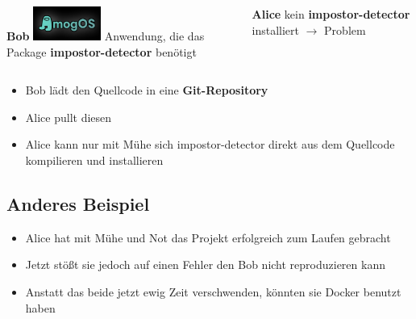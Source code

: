\begin{frame}
    \slidehead
    \vspace{-1em}
    \Large
    \begin{columns}[c]
        \begin{column}{.5\textwidth}
            \centering
            \textbf{Bob} \newline
            \includegraphics[height = 3em]{../pictures/amogos} \newline
            Anwendung, die das Package \textbf{impostor-detector} benötigt
        \end{column}
        \begin{column}{.5\textwidth}
            \centering
            \textbf{Alice} \newline
             \newline
            kein \textbf{impostor-detector} installiert $\rightarrow$ Problem
        \end{column}
    \end{columns}
    \begin{itemize}[<+->]
        \item Bob lädt den Quellcode in eine \textbf{Git-Repository}
        \item Alice pullt diesen
        \item Alice kann nur mit Mühe sich impostor-detector direkt aus dem Quellcode kompilieren und installieren
    \end{itemize}
\end{frame}

\subsection{Anderes Beispiel}
\begin{frame}
    \slidehead
    \vspace{-1em}
    \Large
    \begin{itemize}[<+->]
        \item Alice hat mit Mühe und Not das Projekt erfolgreich zum Laufen gebracht
        \item Jetzt stößt sie jedoch auf einen Fehler den Bob nicht reproduzieren kann
        \item Anstatt das beide jetzt ewig Zeit verschwenden, könnten sie Docker benutzt haben
    \end{itemize}
\end{frame}

